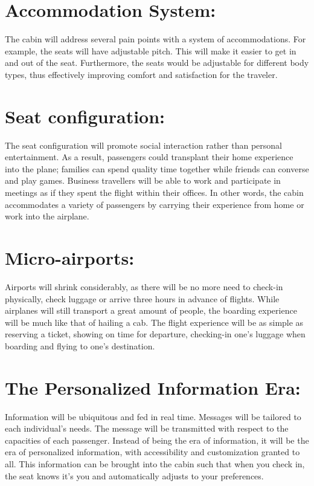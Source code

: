 \documentclass[a4paper, 12pt,conference]{new_cit_thesis}
\begin{document}
\section{Accommodation System:}
The cabin will address several pain points with a system of accommodations. For example, the seats will have adjustable pitch. This will make it easier to get in and out of the seat. Furthermore, the seats would be adjustable for different body types, thus effectively improving comfort and satisfaction for the traveler. 

\section{Seat configuration:}
The seat configuration will promote social interaction rather than personal entertainment. As a result, passengers could transplant their home experience into the plane; families can spend quality time together while friends can converse and play games. Business travellers will be able to work and participate in meetings as if they spent the flight within their offices. In other words, the cabin accommodates a variety of passengers by carrying their experience from home or work into the airplane.

\section{Micro-airports:}
Airports will shrink considerably, as there will be no more need to check-in physically, check luggage or arrive three hours in advance of flights. While airplanes will still transport a great amount of people, the boarding experience will be much like that of hailing a cab. The flight experience will be as simple as reserving a ticket, showing on time for departure, checking-in one’s luggage when boarding and flying to one’s destination.

\section{The Personalized Information Era:}
Information will be ubiquitous and fed in real time. Messages will be tailored to each individual’s needs. The message will be transmitted with respect to the capacities of each passenger. Instead of being the era of information, it will be the era of personalized information, with accessibility and customization granted to all. This information can be brought into the cabin such that when you check in, the seat knows it’s you and automatically adjusts to your preferences.
\end{document}
